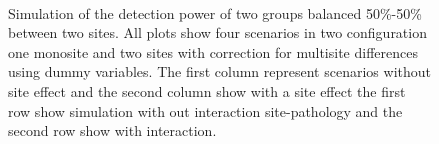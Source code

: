 \documentclass[authoryear]{elsarticle}
\begin{document}
\begin{figure}[t]
     \\
     \tiny Simulation of the detection power of two groups balanced 50\%-50\% between two sites. All plots show four scenarios in two configuration one monosite and two sites with correction for multisite differences using dummy variables. The first column represent scenarios without site effect and the second column show with a site effect the first row show simulation with out interaction site-pathology and the second row show with interaction.
\label{fig_full_sim_site_effect}
 \end{figure}
 
\end{document}
